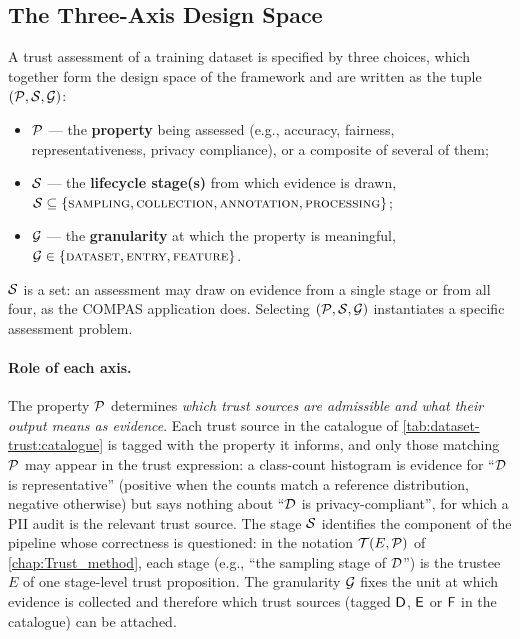 \subsection{The Three-Axis Design Space}
\label{sec:dataset-trust:framework:design-space}

A trust assessment of a training dataset is specified by three choices, which together form the design space of the framework and are written as the tuple $(\mathcal{P}, \mathcal{S}, \mathcal{G})$:

\begin{itemize}
  \item $\mathcal{P}$ --- the \textbf{property} being assessed (e.g., accuracy, fairness, representativeness, privacy compliance), or a composite of several of them;
  \item $\mathcal{S}$ --- the \textbf{lifecycle stage(s)} from which evidence is drawn,
        \\
        $\mathcal{S} \subseteq \{\textsc{sampling}, \textsc{collection},
        \textsc{annotation}, \textsc{processing}\}$;
  \item $\mathcal{G}$ --- the \textbf{granularity} at which the property is
        meaningful,
        \\
        $\mathcal{G} \in \{\textsc{dataset}, \textsc{entry},
        \textsc{feature}\}$.
\end{itemize}
\noindent $\mathcal{S}$ is a set: an assessment may draw on evidence from a single stage or from all four, as the \ac{COMPAS} application does. Selecting $(\mathcal{P}, \mathcal{S}, \mathcal{G})$ instantiates a specific assessment problem.

\paragraph{Role of each axis.}
The property $\mathcal{P}$ determines \emph{which trust sources are admissible and what their output means as evidence}. Each trust source in the catalogue of \cref{tab:dataset-trust:catalogue} is tagged with the property it informs, and only those matching $\mathcal{P}$ may appear in the trust expression: a class-count histogram is evidence for ``$\mathcal{D}$ is representative'' (positive when the counts match a reference distribution, negative otherwise) but says nothing about ``$\mathcal{D}$ is privacy-compliant'', for which a \ac{PII} audit is the relevant trust source. The stage $\mathcal{S}$ identifies the component of the pipeline whose correctness is questioned: in the notation $\mathcal{T}(E, \mathcal{P})$ of \cref{chap:Trust_method}, each stage (e.g., ``the sampling stage of $\mathcal{D}$'') is the trustee $E$ of one stage-level trust proposition. The granularity $\mathcal{G}$ fixes the unit at which evidence is collected and therefore which trust sources (tagged $\textsf{D}$, $\textsf{E}$ or $\textsf{F}$ in the catalogue) can be attached.

